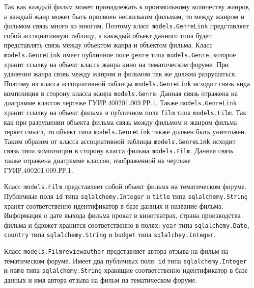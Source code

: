 Так как каждый фильм может принадлежать к произвольному количеству жанров, а каждый жанр может быть присвоен нескольким фильмам, то между жанром и фильмом связь много ко многим. Поэтому класс \texttt{models.Gen\-reLink} представляет собой ассоциативную таблицу, а какждый объект данного типа будет представлять связь между объектом жанра и объектом фильма. Класс \texttt{models.GenreLink} имеет публичное поле \texttt{genre} типа \texttt{models.Gen\-re}, которое хранит ссылку на объект класса жанра кино на тематическом форуме. При удалении жанра свзяь между жанром и фильмом так же должна разрушаться. Поэтому из класса ассоциативной таблицы \texttt{models.GenreLink} исходит связь вида композиция в сторону класса жанра \texttt{models.Genre}. Данная связь отражена на диаграмме классов чертеже ГУИР.400201.009.РР.1. Также \texttt{models.GenreLink} хранит ссылку на объект фильма в публичном поле \texttt{film} типа \texttt{models.Film}. Так как при разрушении объекта фильма связь между фильмом и жанром фильма теряет смысл, то объект типа \texttt{models.GenreLink} также должен быть уничтожен. Таким образом от класса ассоциативной таблицы \texttt{models.GenreLink} исходит связь типа композиции в сторону класса фильма \texttt{models.Film}. Данная связь также отражена диаграмме классов, изображенной на чертеже ГУИР.400201.009.РР.1.

Класс \texttt{models.Film} представляет собой объект фильма на тематическом форуме. Публичные поля \texttt{id} типа \texttt{sqlalchemy.Integer} и \texttt{title} типа \texttt{sqlalchemy.String} хранят соответственно идентификатор в базе данных и название фильма. Информация о дате выхода фильма прокат в кинотеатрах, страна производства фильма и бдюжет хранится соответственно в полях: \texttt{year} типа \texttt{sqlal\-chemy.Date}, \texttt{country} типа \texttt{sqlalchemy.String} и \texttt{budget} типа \texttt{sql\-alchey.Integer}.

Класс \texttt{models.Filmreviewauthor} представляет автора отзыва на фильм на тематическом форуме. Имеет два публичных поля: \texttt{id} типа \texttt{sqlalchemy.In\-teger} и \texttt{name} типа \texttt{sqlalchemy.String} хранящие соответственно идентификатор в базе данных и имя автора отзыва на фильм на тематическом форуме.

